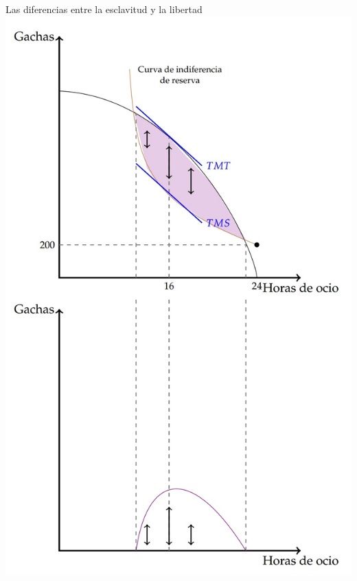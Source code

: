 \documentclass{beamer}
\begin{document}
\begin{frame}{Las diferencias entre la esclavitud y la libertad}
\centering
\includegraphics[scale=0.55]{Slides Principios de Economia/Figures/Instituciones2.jpg}
\end{frame}
\end{document}
